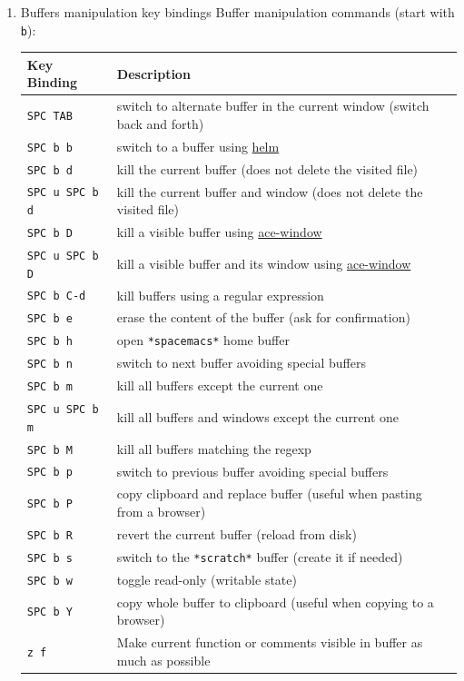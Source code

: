 \documentclass[11pt]{article}
\begin{document}
\begin{enumerate}
\item Buffers manipulation key bindings
\label{sec:org10f0114}
Buffer manipulation commands (start with \texttt{b}):

\begin{center}
\begin{tabular}{ll}
Key Binding & Description\\
\hline
\texttt{SPC TAB} & switch to alternate buffer in the current window (switch back and forth)\\
\texttt{SPC b b} & switch to a buffer using \href{https://github.com/emacs-helm/helm}{helm}\\
\texttt{SPC b d} & kill the current buffer (does not delete the visited file)\\
\texttt{SPC u SPC b d} & kill the current buffer and window (does not delete the visited file)\\
\texttt{SPC b D} & kill a visible buffer using \href{https://github.com/abo-abo/ace-window}{ace-window}\\
\texttt{SPC u SPC b D} & kill a visible buffer and its window using \href{https://github.com/abo-abo/ace-window}{ace-window}\\
\texttt{SPC b C-d} & kill buffers using a regular expression\\
\texttt{SPC b e} & erase the content of the buffer (ask for confirmation)\\
\texttt{SPC b h} & open \texttt{*spacemacs*} home buffer\\
\texttt{SPC b n} & switch to next buffer avoiding special buffers\\
\texttt{SPC b m} & kill all buffers except the current one\\
\texttt{SPC u SPC b m} & kill all buffers and windows except the current one\\
\texttt{SPC b M} & kill all buffers matching the regexp\\
\texttt{SPC b p} & switch to previous buffer avoiding special buffers\\
\texttt{SPC b P} & copy clipboard and replace buffer (useful when pasting from a browser)\\
\texttt{SPC b R} & revert the current buffer (reload from disk)\\
\texttt{SPC b s} & switch to the \texttt{*scratch*} buffer (create it if needed)\\
\texttt{SPC b w} & toggle read-only (writable state)\\
\texttt{SPC b Y} & copy whole buffer to clipboard (useful when copying to a browser)\\
\texttt{z f} & Make current function or comments visible in buffer as much as possible\\
\end{tabular}
\end{center}


\end{enumerate}
\end{document}
